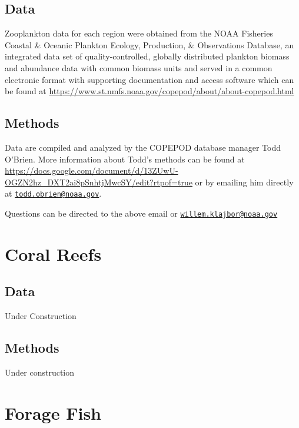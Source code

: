 \documentclass[
]{book}
\begin{document}
\hypertarget{data}{%
\section{Data}\label{data}}

Zooplankton data for each region were obtained from the NOAA Fisheries Coastal \& Oceanic Plankton Ecology, Production, \& Observations Database, an integrated data set of quality-controlled, globally distributed plankton biomass and abundance data with common biomass units and served in a common electronic format with supporting documentation and access software which can be found at \url{https://www.st.nmfs.noaa.gov/copepod/about/about-copepod.html}

\hypertarget{methods}{%
\section{Methods}\label{methods}}

Data are compiled and analyzed by the COPEPOD database manager Todd O'Brien. More information about Todd's methods can be found at \url{https://docs.google.com/document/d/13ZUwU-OGZN2hz_DXT2ai8pSnhtjMwcSY/edit?rtpof=true} or by emailing him directly at \href{mailto:todd.obrien@noaa.gov}{\nolinkurl{todd.obrien@noaa.gov}}.

Questions can be directed to the above email or \href{mailto:willem.klajbor@noaa.gov}{\nolinkurl{willem.klajbor@noaa.gov}}

\hypertarget{coral-reefs}{%
\chapter{Coral Reefs}\label{coral-reefs}}

\hypertarget{data-1}{%
\section{Data}\label{data-1}}

Under Construction

\hypertarget{methods-1}{%
\section{Methods}\label{methods-1}}

Under construction

\hypertarget{forage-fish}{%
\chapter{Forage Fish}\label{forage-fish}}
\end{document}

